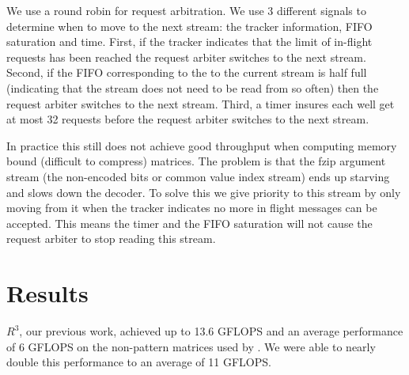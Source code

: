 We use a round robin for request arbitration. We use 3 different signals to determine when to move to the next stream: the tracker information, FIFO saturation and time. First, if the tracker indicates that the limit of in-flight requests has been reached the request arbiter switches to the next stream. Second, if the FIFO corresponding to the to the current stream is half full (indicating that the stream does not need to be read from so often) then the request arbiter switches to the next stream. Third, a timer insures each well get at most 32 requests before the request arbiter switches to the next stream.

\par In practice this still does not achieve good throughput when computing memory bound (difficult to compress) matrices. The problem is that the fzip argument stream (the non-encoded bits or common value index stream) ends up starving and slows down the decoder. To solve this we give priority to this stream by only moving from it when the tracker indicates no more in flight messages can be accepted. This means the timer and the FIFO saturation will not cause the request arbiter to stop reading this stream.
\section{Results}
$R^3$, our previous work, achieved up to 13.6 GFLOPS and an average performance of 6 GFLOPS on the non-pattern matrices used by \cite{prelim:bell}. We were able to nearly double this performance to an average of 11 GFLOPS.

